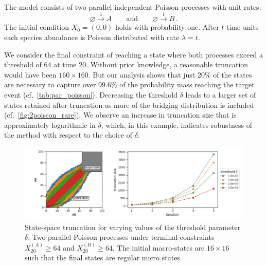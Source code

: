 \begin{model}
The model consists of two parallel independent Poisson processes with unit rates.
$$ \varnothing \xrightarrow{1} A \qquad\text{and}\qquad \varnothing \xrightarrow{1} B\,. $$
The initial condition $X_0=(0,0)$ holds with probability one. After $t$ time units each species abundance
is Poisson distributed with rate $\lambda=t$.
\end{model}
We consider the final constraint of reaching a state where both
processes exceed a threshold of $64$ at time $20$.
Without prior knowledge, a reasonable truncation would have been $160\times 160$. But our analysis shows that just 20\% of the states are necessary to capture over 99.6\% of the probability mass reaching the
target event (cf.\ \autoref{tab:par_poisson}).
Decreasing the threshold $\delta$ leads to a larger set of states retained after truncation as more of the bridging distribution is included (cf.\ \autoref{fig:2poisson_rare}).
We observe an increase in truncation size that is approximately
logarithmic in $\delta$, which, in this example, indicates robustness of the method with respect to the choice of $\delta$.
\begin{figure}[!t]
    \centering
    \includegraphics[width=\textwidth]{gfx/truncs.png}
	\caption[State-space truncation for varying values of the
	threshold parameter $\delta$]{State-space truncation for varying values of the
    threshold parameter $\delta$: Two parallel Poisson processes under terminal constraints $X_{20}^{(A)} \geq 64$ and $X_{20}^{(B)}\geq 64$.
    The initial macro-states are $16\times 16$ such that the final
    states are regular micro states.}
    \label{fig:2poisson_rare}
\end{figure}

